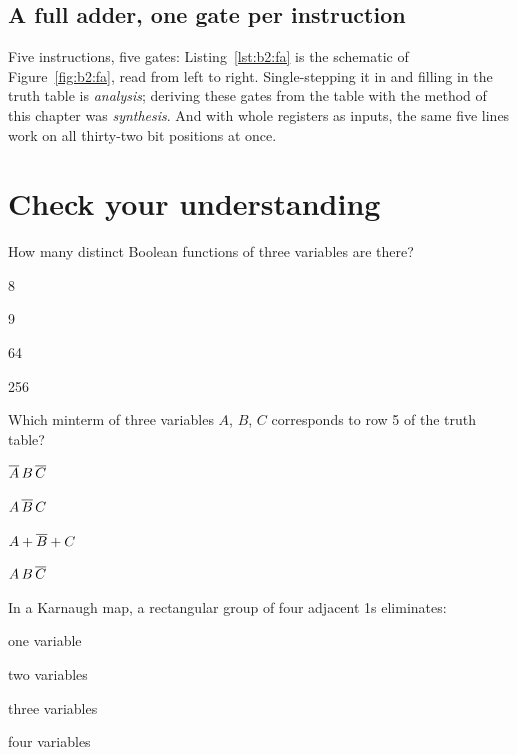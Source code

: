 \subsection{A full adder, one gate per instruction}


Five instructions, five gates: Listing~\ref{lst:b2:fa} is the schematic of
Figure~\ref{fig:b2:fa}, read from left to right. Single-stepping it in \prgqt
and filling in the truth table is \emph{analysis}; deriving these gates from
the table with the method of this chapter was \emph{synthesis}. And with
whole registers as inputs, the same five lines work on all thirty-two bit
positions at once.





\section{Check your understanding}

\begin{quiz}{How many distinct Boolean functions of three variables are there?}
\item 8
\item 9
\item 64
\item 256
\end{quiz}

\begin{quiz}{Which minterm of three variables $A$, $B$, $C$ corresponds to row 5 of the truth table?}
\item $\overline{A}\,B\,\overline{C}$
\item $A\,\overline{B}\,C$
\item $A+\overline{B}+C$
\item $A\,B\,\overline{C}$
\end{quiz}

\begin{quiz}{In a Karnaugh map, a rectangular group of four adjacent 1s eliminates:}
\item one variable
\item two variables
\item three variables
\item four variables
\end{quiz}

